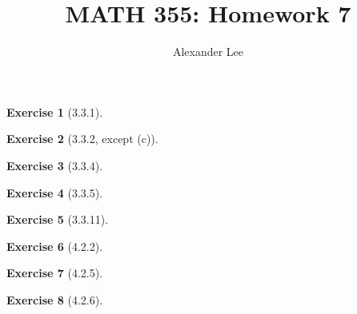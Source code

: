 \documentclass{amsart}
\title{MATH 355: Homework 7}
\author{Alexander Lee}
\theoremstyle{definition}
\newtheorem{exercise}{Exercise}
\begin{document}
\maketitle

\begin{exercise}[3.3.1]
\end{exercise}

\begin{exercise}[3.3.2, except (c)]
\end{exercise}

\begin{exercise}[3.3.4]
\end{exercise}

\begin{exercise}[3.3.5]
\end{exercise}

\begin{exercise}[3.3.11]
\end{exercise}

\begin{exercise}[4.2.2]
\end{exercise}

\begin{exercise}[4.2.5]
\end{exercise}

\begin{exercise}[4.2.6]
\end{exercise}
\end{document}
